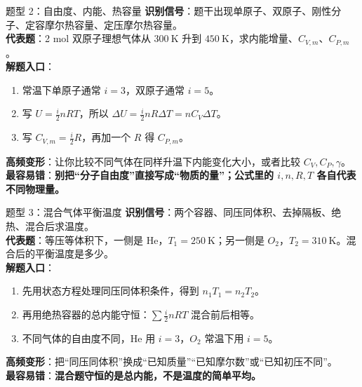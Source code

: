 \documentclass[11pt,a4paper]{ctexart}
\newcommand{\warn}[1]{\textcolor{red!70!black}{\textbf{#1}}}
\begin{document}
\begin{typebox}{题型 2：自由度、内能、热容量}
\textbf{识别信号}：题干出现单原子、双原子、刚性分子、定容摩尔热容量、定压摩尔热容量。\\
\textbf{代表题}：2 mol 双原子理想气体从 \(300\ \mathrm{K}\) 升到 \(450\ \mathrm{K}\)，求内能增量、\(C_{V,m}\)、\(C_{P,m}\)。\\
\textbf{解题入口}：
\begin{enumerate}
  \item 常温下单原子通常 \(i=3\)，双原子通常 \(i=5\)。
  \item 写 \(U=\frac{i}{2}nRT\)，所以 \(\Delta U=\frac{i}{2}nR\Delta T=nC_V\Delta T\)。
  \item 写 \(C_{V,m}=\frac{i}{2}R\)，再加一个 \(R\) 得 \(C_{P,m}\)。
\end{enumerate}
\textbf{高频变形}：让你比较不同气体在同样升温下内能变化大小，或者比较 \(C_V,C_P,\gamma\)。\\
\textbf{最容易错}：\warn{别把“分子自由度”直接写成“物质的量”；公式里的 \(i,n,R,T\) 各自代表不同物理量。}
\end{typebox}

\begin{typebox}{题型 3：混合气体平衡温度}
\textbf{识别信号}：两个容器、同压同体积、去掉隔板、绝热、混合后求温度。\\
\textbf{代表题}：等压等体积下，一侧是 He，\(T_1=250\ \mathrm{K}\)；另一侧是 \(O_2\)，\(T_2=310\ \mathrm{K}\)。混合后的平衡温度是多少。\\
\textbf{解题入口}：
\begin{enumerate}
  \item 先用状态方程处理同压同体积条件，得到 \(n_1T_1=n_2T_2\)。
  \item 再用绝热容器的总内能守恒：\(\sum \frac{i}{2}nRT\) 混合前后相等。
  \item 不同气体的自由度不同，He 用 \(i=3\)，\(O_2\) 常温下用 \(i=5\)。
\end{enumerate}
\textbf{高频变形}：把“同压同体积”换成“已知质量”“已知摩尔数”或“已知初压不同”。\\
\textbf{最容易错}：\warn{混合题守恒的是总内能，不是温度的简单平均。}
\end{typebox}
\end{document}
